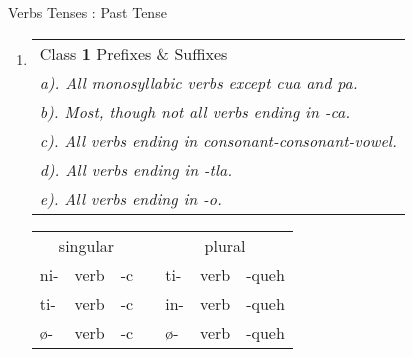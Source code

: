 \documentclass[12pt]{beamer}
\newcommand{\nah}[1]{\textcolor{nahgrn}{#1}}
\newcommand{\trs}[1]{\textcolor{nahblu}{#1}}
\begin{document}
\begin{frame}
\begin{columns}[t]
\begin{column}{.26\linewidth}
\begin{block}{Verbs Tenses : Past Tense}
\begin{enumerate}
    			\item \begin{tabular}[t]{l} %
    				Class \textbf{1} \nah{Prefixes} \& \trs{Suffixes}			\\
    				\textit{a). All monosyllabic verbs except cua and pa.} 		\\
    				\textit{b). Most, though not all verbs ending in -ca.} 		\\
    				\textit{c). All verbs ending in consonant-consonant-vowel.} \\
    				\textit{d). All verbs ending in -tla.} 						\\
    				\textit{e). All verbs ending in -o.}						\\
    			\end{tabular}
    			\begin{tabular}[t]{lllllll}
    				\multicolumn{3}{c}{singular}    & \vline & \multicolumn{3}{c}{plural}        \\
    				\cline{1-7}
    				\nah{ni-}   & verb & \trs{-c}   & \vline & \nah{ti-}   & verb & \trs{-queh}  \\
    				\nah{ti-}   & verb & \trs{-c}   & \vline & \nah{in-}   & verb & \trs{-queh}  \\
    				\nah{ø-}    & verb & \trs{-c}   & \vline & \nah{ø-}    & verb & \trs{-queh}  \\
    			\end{tabular}
    			

\end{enumerate}
\end{block}
\end{column}
\end{columns}
\end{frame}
\end{document}
